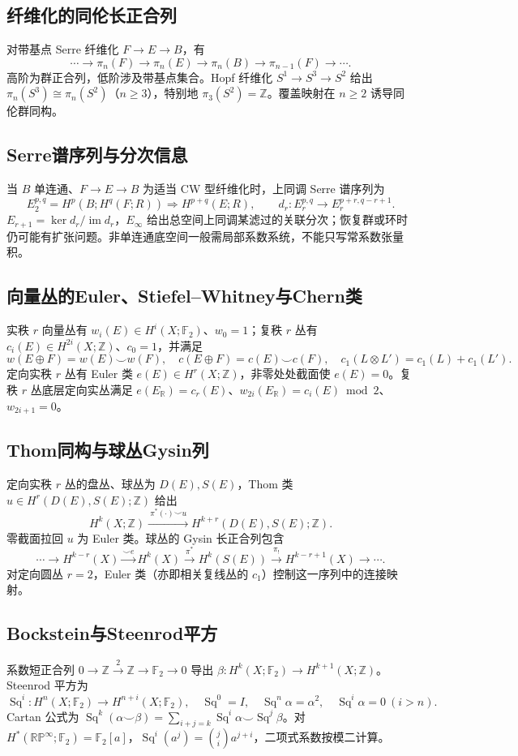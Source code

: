 \documentclass[../main.tex]{subfiles}
\begin{document}
\subsection{纤维化的同伦长正合列}
对带基点 Serre 纤维化 $F\to E\to B$，有
\[
\cdots\to\pi_n(F)\to\pi_n(E)\to\pi_n(B)\to\pi_{n-1}(F)\to\cdots.
\]
高阶为群正合列，低阶涉及带基点集合。Hopf 纤维化 $S^1\to S^3\to S^2$ 给出 $\pi_n(S^3)\cong\pi_n(S^2)$（$n\ge3$），特别地 $\pi_3(S^2)=\mathbb Z$。覆盖映射在 $n\ge2$ 诱导同伦群同构。
\subsection{Serre谱序列与分次信息}
当 $B$ 单连通、$F\to E\to B$ 为适当 CW 型纤维化时，上同调 Serre 谱序列为
\[
E_2^{p,q}=H^p(B;H^q(F;R))\Longrightarrow H^{p+q}(E;R),\qquad
d_r:E_r^{p,q}\to E_r^{p+r,q-r+1}.
\]
$E_{r+1}=\ker d_r/\operatorname{im}d_r$，$E_\infty$ 给出总空间上同调某滤过的关联分次；恢复群或环时仍可能有扩张问题。非单连通底空间一般需局部系数系统，不能只写常系数张量积。
\subsection{向量丛的Euler、Stiefel--Whitney与Chern类}
实秩 $r$ 向量丛有 $w_i(E)\in H^i(X;\mathbb F_2)$、$w_0=1$；复秩 $r$ 丛有 $c_i(E)\in H^{2i}(X;\mathbb Z)$、$c_0=1$，并满足
\[
w(E\oplus F)=w(E)\smile w(F),\quad c(E\oplus F)=c(E)\smile c(F),\quad
c_1(L\otimes L')=c_1(L)+c_1(L').
\]
定向实秩 $r$ 丛有 Euler 类 $e(E)\in H^r(X;\mathbb Z)$，非零处处截面使 $e(E)=0$。复秩 $r$ 丛底层定向实丛满足 $e(E_\mathbb R)=c_r(E)$、$w_{2i}(E_\mathbb R)=c_i(E)\bmod2$、$w_{2i+1}=0$。
\subsection{Thom同构与球丛Gysin列}
定向实秩 $r$ 丛的盘丛、球丛为 $D(E),S(E)$，Thom 类 $u\in H^r(D(E),S(E);\mathbb Z)$ 给出
\[
H^k(X;\mathbb Z)\xrightarrow{\ \pi^*(\cdot)\smile u\ }H^{k+r}(D(E),S(E);\mathbb Z).
\]
零截面拉回 $u$ 为 Euler 类。球丛的 Gysin 长正合列包含
\[
\cdots\to H^{k-r}(X)\xrightarrow{\smile e}H^k(X)
\xrightarrow{\pi^*}H^k(S(E))\xrightarrow{\pi_!}H^{k-r+1}(X)\to\cdots.
\]
对定向圆丛 $r=2$，Euler 类（亦即相关复线丛的 $c_1$）控制这一序列中的连接映射。
\subsection{Bockstein与Steenrod平方}
系数短正合列 $0\to\mathbb Z\xrightarrow{2}\mathbb Z\to\mathbb F_2\to0$ 导出 $\beta:H^k(X;\mathbb F_2)\to H^{k+1}(X;\mathbb Z)$。Steenrod 平方为
\[
\operatorname{Sq}^i:H^n(X;\mathbb F_2)\to H^{n+i}(X;\mathbb F_2),\quad
\operatorname{Sq}^0=I,\quad\operatorname{Sq}^n\alpha=\alpha^2,\quad\operatorname{Sq}^i\alpha=0\ (i>n).
\]
Cartan 公式为 $\operatorname{Sq}^k(\alpha\smile\beta)=\sum_{i+j=k}\operatorname{Sq}^i\alpha\smile\operatorname{Sq}^j\beta$。对 $H^*(\mathbb{RP}^\infty;\mathbb F_2)=\mathbb F_2[a]$，$\operatorname{Sq}^i(a^j)=\binom ji a^{j+i}$，二项式系数按模二计算。
\end{document}
